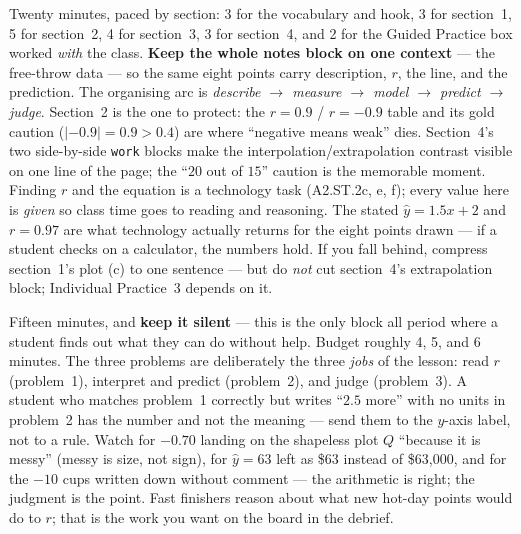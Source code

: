 \documentclass[10pt]{article}
\begin{document}
\begin{teachernote}
Twenty minutes, paced by section: 3 for the vocabulary and hook, 3 for section~1, 5 for
section~2, 4 for section~3, 3 for section~4, and 2 for the Guided Practice box worked \emph{with}
the class. \textbf{Keep the whole notes block on one context} --- the free-throw data --- so the
same eight points carry description, $r$, the line, and the prediction. The organising arc is
\emph{describe $\to$ measure $\to$ model $\to$ predict $\to$ judge}. Section~2 is the one to
protect: the $r=0.9$ / $r=-0.9$ table and its gold caution ($|{-0.9}|=0.9>0.4$) are where
``negative means weak'' dies. Section~4's two side-by-side \texttt{work} blocks make the
interpolation/extrapolation contrast visible on one line of the page; the ``$20$ out of $15$''
caution is the memorable moment. Finding $r$ and the equation is a technology task
(A2.ST.2c, e, f); every value here is \emph{given} so class time goes to reading and reasoning.
The stated $\hat y=1.5x+2$ and $r=0.97$ are what technology actually returns for the eight points
drawn --- if a student checks on a calculator, the numbers hold. If you fall behind, compress
section~1's plot (c) to one sentence --- but do \emph{not} cut section~4's extrapolation block;
Individual Practice~3 depends on it.
\end{teachernote}

\begin{teachernote}
Fifteen minutes, and \textbf{keep it silent} --- this is the only block all period where a student
finds out what they can do without help. Budget roughly 4, 5, and 6 minutes. The three problems
are deliberately the three \emph{jobs} of the lesson: read $r$ (problem~1), interpret and predict
(problem~2), and judge (problem~3). A student who matches problem~1 correctly but writes ``$2.5$
more'' with no units in problem~2 has the number and not the meaning --- send them to the
$y$-axis label, not to a rule. Watch for $-0.70$ landing on the shapeless plot $Q$ ``because it
is messy'' (messy is size, not sign), for $\hat y=63$ left as \$63 instead of \$63{,}000, and for
the $-10$ cups written down without comment --- the arithmetic is right; the judgment is the
point. Fast finishers reason about what new hot-day points would do to $r$; that is the work you
want on the board in the debrief.
\end{teachernote}
\end{document}
